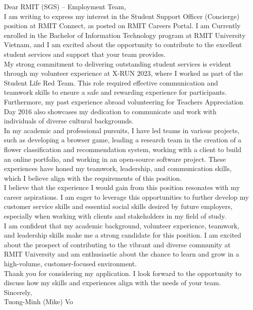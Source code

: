 \documentclass[a4paper,11pt]{article}
\begin{document}
{Dear RMIT (SGS) – Employment Team,\\\vspace{6pt}}
{I am writing to express my interest in the Student Support Officer (Concierge) position at RMIT Connect, as posted on RMIT Careers Portal. I am Currently enrolled in the Bachelor of Information Technology program at RMIT University Vietnam, and I am excited about the opportunity to contribute to the excellent student services and support that your team provides.\\\vspace{6pt}}
{My strong commitment to delivering outstanding student services is evident through my volunteer experience at X-RUN 2023, where I worked as part of the Student Life Red Team. This role required effective communication and teamwork skills to ensure a safe and rewarding experience for participants. Furthermore, my past experience abroad volunteering for Teachers Appreciation Day 2016 also showcases my dedication to communicate and work with individuals of diverse cultural backgrounds.\\\vspace{6pt}}
{In my academic and professional pursuits, I have led teams in various projects, such as developing a browser game, leading a research team in the creation of a flower classification and recommendation system, working with a client to build an online portfolio, and working in an open-source software project. These experiences have honed my teamwork, leadership, and communication skills, which I believe align with the requirements of this position.\\\vspace{6pt}}
{I believe that the experience I would gain from this position resonates with my career aspirations. I am eager to leverage this opportunities to further develop my customer service skills and essential social skills desired by future employers, especially when working with clients and stakeholders in my field of study.\\\vspace{6pt}}
{I am confident that my academic background, volunteer experience, teamwork, and leadership skills make me a strong candidate for this position. I am excited about the prospect of contributing to the vibrant and diverse community at RMIT University and am enthusiastic about the chance to learn and grow in a high-volume, customer-focused environment.\\\vspace{6pt}}
{Thank you for considering my application. I look forward to the opportunity to discuss how my skills and experiences align with the needs of your team.\\\vspace{6pt}}
{Sincerely,\\Tuong-Minh (Mike) Vo}
\end{document}
